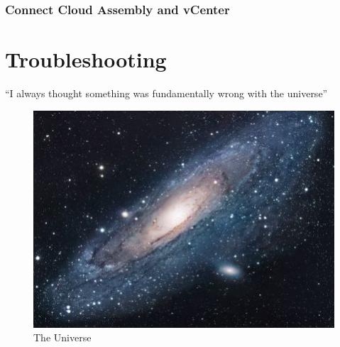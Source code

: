 \documentclass{article}
\begin{document}
\subsubsection{Connect Cloud Assembly and vCenter}


\section{Troubleshooting}
``I always thought something was fundamentally wrong with the universe'' \citep{adams1995hitchhiker}


\begin{figure}[h!]
\centering
\includegraphics[scale=1.7]{universe}
\caption{The Universe}
\label{fig:universe}
\end{figure}




\end{document}
